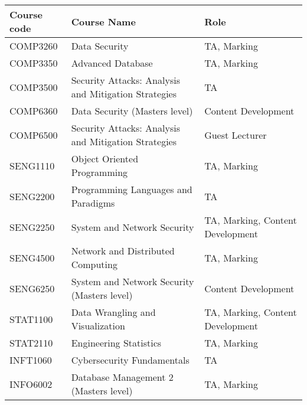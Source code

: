 \documentclass{myresume}
\begin{document}
            \begin{center}
            \begin{tabular}{ l l l }
                    \hline
                    \textbf{Course code} & \textbf{Course Name} & \textbf{Role} \\
                    \hline
                    COMP3260 & Data Security & TA, Marking \\
                    COMP3350 & Advanced Database & TA, Marking \\
                    COMP3500 & Security Attacks: Analysis and Mitigation Strategies & TA \\
                    COMP6360 & Data Security (Masters level) & Content Development \\
                    COMP6500 & Security Attacks: Analysis and Mitigation Strategies & Guest Lecturer \\
                    SENG1110 & Object Oriented Programming & TA, Marking \\
                    SENG2200 & Programming Languages and Paradigms & TA \\
                    SENG2250 & System and Network Security & TA, Marking, Content Development \\
                    SENG4500 & Network and Distributed Computing & TA, Marking \\
                    SENG6250 & System and Network Security (Masters level) & Content Development \\
                    STAT1100 & Data Wrangling and Visualization & TA, Marking, Content Development \\
                    STAT2110 & Engineering Statistics & TA, Marking \\
                    INFT1060 & Cybersecurity Fundamentals & TA \\
                    INFO6002 & Database Management 2 (Masters level) & TA, Marking \\
                    \hline
            \end{tabular}
            \end{center}



    	
	\nocite{*}
	
\end{document}
